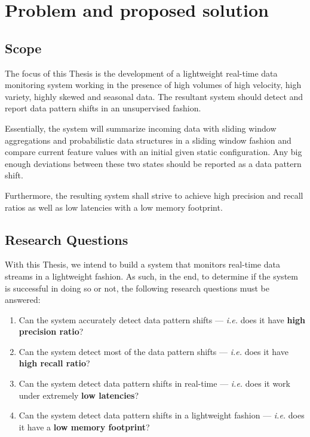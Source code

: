 \chapter{Problem and proposed solution} \label{chap:approach} \minitoc

\section{Scope}
The focus of this Thesis is the development of a lightweight real-time data monitoring system working in the presence of high volumes of high velocity, high variety, highly skewed and seasonal data. The resultant system should detect and report data pattern shifts in an unsupervised fashion. 

Essentially, the system will summarize incoming data with sliding window aggregations and probabilistic data structures in a sliding window fashion and compare current feature values with an initial given static configuration. Any big enough deviations between these two states should be reported as a data pattern shift.

Furthermore, the resulting system shall strive to achieve high precision and recall ratios as well as low latencies with a low memory footprint.


\section{Research Questions}
With this Thesis, we intend to build a system that monitors real-time data streams in a lightweight fashion. As such, in the end, to determine if the system is successful in doing so or not, the following research questions must be answered:

\begin{enumerate}[start=1, label={\textbf{RQ\arabic*:}}]
    \item Can the system accurately detect data pattern shifts --- \textit{i.e.} does it have \textbf{high precision ratio}?
    
    \item Can the system detect most of the data pattern shifts --- \textit{i.e.} does it have \textbf{high recall ratio}?
    
    \item Can the system detect data pattern shifts in real-time --- \textit{i.e.} does it work under extremely \textbf{low latencies}?
    
    \item Can the system detect data pattern shifts in a lightweight fashion --- \textit{i.e.} does it have a \textbf{low memory footprint}?

\end{enumerate}

